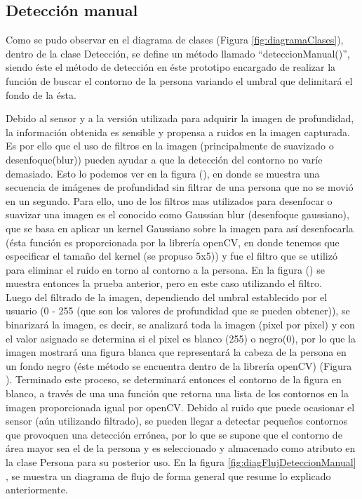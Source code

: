 \documentclass[a4paper,openright,12pt]{report}
\begin{document}
\subsection{Detección manual}
Como se pudo observar en el diagrama de clases (Figura \ref{fig:diagramaClases}), dentro de la clase Detección, se define un método llamado ``deteccionManual()'', siendo éste el método de detección en éste prototipo encargado de realizar la función de buscar el contorno de la persona variando el umbral que delimitará el fondo de la ésta.\\
\begin{comment}
\begin{algorithm}[htb]
	\SetAlgoLined
	\KwData{Imagen Depth, Imagen RGB, class Persona}
	\KwResult{Hallar contorno de la persona}
	Aplicar filtros a Depth\;
	Binarizar Depth con umbral actual\;
	Buscar contornos en Depth\;
	\If{Hay contornos}{
		Seleccionar contorno con área mayor\;
		Guardar contorno seleccionado en class Persona\;
		Mostrar contorno en imagen RGB\;
	}
	\caption{Detección manual}
	\label{alg:deteccionManual}
\end{algorithm}
\end{comment}
Debido al sensor y a la versión utilizada para adquirir la imagen de profundidad, la información obtenida es sensible y propensa a ruidos en la imagen capturada. Es por ello que el uso de filtros en la imagen (principalmente de suavizado o desenfoque(blur)) pueden ayudar a que la detección del contorno no varíe demasiado. Esto lo podemos ver en la figura (), en donde se muestra una secuencia de imágenes de profundidad sin filtrar de una persona que no se movió en un segundo. Para ello, uno de los filtros mas utilizados para desenfocar o suavizar una imagen es el conocido como Gaussian blur (desenfoque gaussiano), que se basa en aplicar un kernel Gaussiano sobre la imagen para así desenfocarla (ésta función es proporcionada por la librería openCV, en donde tenemos que especificar el tamaño del kernel (se propuso 5x5)) y fue el filtro que se utilizó para eliminar el ruido en torno al contorno a la persona. En la figura () se muestra entonces la prueba anterior, pero en este caso utilizando el filtro.\\
Luego del filtrado de la imagen, dependiendo del umbral establecido por el usuario (0 - 255 (que son los valores de profundidad que se pueden obtener)), se binarizará la imagen, es decir, se analizará toda la imagen (pixel por pixel) y con el valor asignado se determina si el pixel es blanco (255) o negro(0), por lo que la imagen mostrará una figura blanca que representará la cabeza de la persona en un fondo negro (éste método se encuentra dentro de la librería openCV) (Figura ). Terminado este proceso, se determinará entonces el contorno de la figura en blanco, a través de una una función que retorna una lista de los contornos en la imagen proporcionada igual por openCV. Debido al ruido que puede ocasionar el sensor (aún utilizando filtrado), se pueden llegar a detectar pequeños contornos que provoquen una detección errónea, por lo que se supone que el contorno de área mayor sea el de la persona y es seleccionado y almacenado como atributo en la clase Persona para su posterior uso. En la figura \ref{fig:diagFlujDeteccionManual} , se muestra un diagrama de flujo de forma general que resume lo explicado anteriormente.
\end{document}
